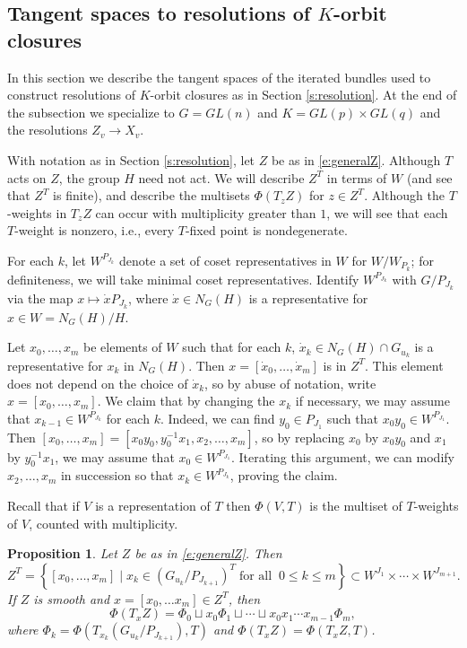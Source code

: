 \documentclass[11pt,letterpaper,reqno]{amsart}
\numberwithin{equation}{section}
\theoremstyle{plain}
\newtheorem{proposition}[theorem]{Proposition}
\theoremstyle{definition}
\theoremstyle{remark}
\begin{document}
\subsection{Tangent spaces to resolutions of $K$-orbit closures} \label{ss:tangentK}
In this section we describe the tangent spaces of the iterated bundles used to
construct resolutions of
$K$-orbit closures as in Section \ref{s:resolution}.
At the end of the subsection we specialize to $G = GL(n)$ and $K = GL(p) \times GL(q)$ and the resolutions $Z_v \to X_v$.

With notation as in Section \ref{s:resolution}, let
$Z$ be as in \eqref{e:generalZ}.
Although \(T\) acts on \(Z\), the group \(H\) need not act.  
We will describe \(Z^T\) in terms of \(W\) (and see that $Z^T$ is finite), and describe the multisets
 $\Phi(T_z Z)$ for $z \in Z^T$.  Although the $T$-weights in \(T_zZ\) can
occur with multiplicity greater than $1$, we will see that each \(T\)-weight is nonzero, i.e., every 
$T$-fixed point is nondegenerate.

For each $k$, let $W^{P_{J_k}}$ denote a set of coset representatives
in $W$ for $W/W_{P_k}$; for definiteness, we will take minimal coset representatives.
Identify $W^{P_{J_k}}$ with $G/P_{J_k}$
via the map $x \mapsto \dot{x} P_{J_k}$, where $\dot{x} \in N_G(H) $ is a representative for $x \in W = N_G(H)/H$.

Let $x_0, \ldots, x_m$ be elements of
$W$ such that for each $k$, $\dot{x}_k \in N_G(H) \cap G_{u_{k}}$ is a representative for $x_k$ in $N_G(H)$.
Then  $x = [\dot{x}_0, \ldots, \dot{x}_m]$ is in $Z^T$.  This element does not depend on the choice
of $\dot{x}_k$, so by abuse of notation, write $x = [x_0, \ldots, x_m]$.  We
claim that by changing the $x_k$ if necessary, we may assume that $x_{k-1} \in W^{P_{J_k}}$ for each $k$.  Indeed, we can find
$y_0 \in P_{J_1}$ such that $x_0 y_0 \in W^{P_{J_1}}$.  Then $[x_0, \ldots, x_m] = [x_0 y_0, y_0^{-1} x_1, x_2, \ldots, x_m]$, so by replacing
$x_0$ by $x_0 y_0$ and $x_1$ by $ y_0^{-1} x_1$, we may assume that $x_0 \in W^{P_{J_1}}$.  Iterating this argument, we
can modify $x_2, \ldots, x_m$ in succession so that $x_k \in  W^{P_{J_k}}$, proving the claim.

Recall that if $V$ is a representation of $T$ then $\Phi(V,T)$ is the multiset of $T$-weights of $V$, counted with multiplicity.

\begin{proposition}\label{p:T-fixed-weights}
Let $Z$ be as in \eqref{e:generalZ}.
Then
\begin{equation} \label{e:H-fixed1}
Z^T =\left\{ [x_0,\ldots,x_m] \mid  x_k  \in (G_{u_k}/P_{J_{k+1}})^T \;\text{for all}\;\; 0\leq k\leq m\right\} \subset W^{J_1} \times \cdots \times W^{J_{m+1}}.
\end{equation}
If $Z$ is smooth and $x = [x_0, \ldots x_m] \in Z^T$, then
\begin{equation} \label{e:H-fixed2}
\Phi(T_xZ) = \Phi_0 \sqcup x_0 \Phi_1 \sqcup \cdots \sqcup x_0 x_1 \cdots x_{m-1} \Phi_m,
\end{equation}
where $\Phi_k = \Phi( T_{{x_k}}(G_{u_k}/P_{J_{k+1}}),T)$ and \(\Phi(T_xZ)  = \Phi(T_xZ,T)\).   
\end{proposition}
\end{document}
